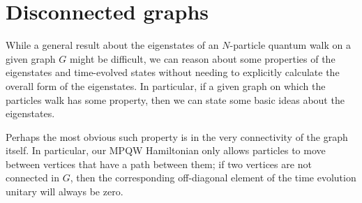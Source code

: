 \documentclass[../thesis-main/thesis-main]{subfiles}
\begin{document}
%
%
%



\section{Disconnected graphs}
While a general result about the eigenstates of an $N$-particle quantum walk on a given graph $G$ might be difficult, we can reason about some properties of the eigenstates and time-evolved states without needing to explicitly calculate the overall form of the eigenstates.  In particular, if a given graph on which the particles walk has some property, then we can state some basic ideas about the eigenstates.

Perhaps the most obvious such property is in the very connectivity of the graph itself.  In particular, our MPQW Hamiltonian  only allows particles to move between vertices that have a path between them; if two vertices are not connected in $G$, then the corresponding off-diagonal element of the time evolution unitary will always be zero.
\end{document}
